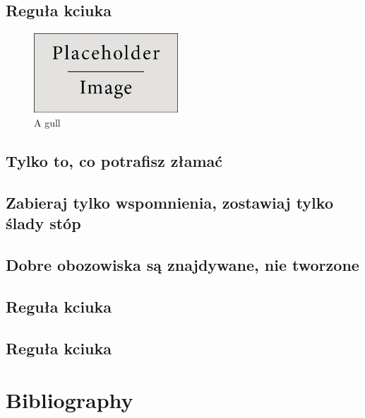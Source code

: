 \documentclass[11pt,fleqn]{book} %
\begin{document}
\section{Reguła kciuka}\label{regula-kciuka}
\lipsum
\begin{figure}
	\begin{center}
		\includegraphics[width=0.48\textwidth]{Pictures/placeholder}
	\end{center}
	\caption{A gull}
\end{figure}

\section{Tylko to, co potrafisz złamać}\label{regula-drewno}
\section{Zabieraj tylko wspomnienia, zostawiaj tylko ślady stóp}\label{regula-zabierz-zostaw}
\section{Dobre obozowiska są znajdywane, nie tworzone}\label{regula-dobre-obozowiska}
\section{Reguła kciuka}\label{regula-kciuka}
\section{Reguła kciuka}\label{regula-kciuka}



\chapter*{Bibliography}
\end{document}
